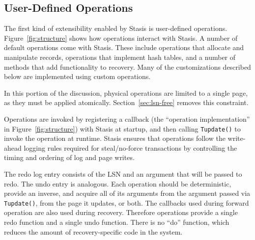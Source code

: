 \documentclass[letterpaper,twocolumn,10pt]{article}
\newcommand{\yad}{Stasis\xspace}
\begin{document}
\subsection{User-Defined Operations}
\label{sec:operations}

The first kind of extensibility enabled by \yad is user-defined operations.
Figure~\ref{fig:structure} shows how operations interact with \yad.  A
number of default operations come with \yad.  These include operations
that allocate and manipulate records, operations that implement hash
tables, and a number of methods that add functionality to recovery.
Many of the customizations described below are implemented using
custom operations. 

In this portion of the discussion, physical operations are limited to a single
page, as they must be applied atomically. Section~\ref{sec:lsn-free} removes this constraint.

Operations are invoked by registering a callback (the ``operation
implementation'' in Figure~\ref{fig:structure}) with \yad at startup,
and then calling {\tt Tupdate()} to invoke the operation at runtime.
\yad ensures that operations follow the write-ahead logging rules
required for steal/no-force transactions by controlling the timing and
ordering of log and page writes.  

The redo log entry consists of the
LSN and an argument that will be passed to redo.  The undo entry is
analogous. Each
operation should be deterministic, provide an inverse, and acquire all
of its arguments from the argument passed via {\tt Tupdate()},
from the page it updates, or both.  The callbacks used during forward
operation are also used during recovery.  Therefore operations provide
a single redo function and a single undo function.  There is no ``do''
function, which reduces the amount of recovery-specific code in the
system.

\end{document}
